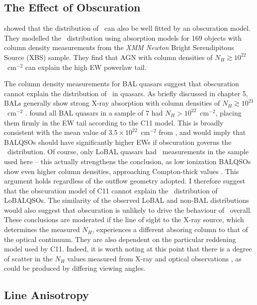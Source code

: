 \subsection{The Effect of Obscuration}
\label{sec:obscure}

\citet[][hereafter C11]{caccianiga2011} showed that the distribution of \ewo\
can also be well fitted by an obscuration model. They modelled the 
\ewo\ distribution using absorption models for 169 objects with column density
measurements from the {\sl XMM Newton} Bright Serendipitous Source (XBS)
sample. They find that AGN with column densities of 
$N_H\gtrsim10^{22}$~cm$^{-2}$ can explain the high EW powerlaw tail. 

The column density measurements for BAL quasars suggest that obscuration 
cannot explain the distribution of \ewo\ in quasars. 
As briefly discussed in chapter 5, BALs generally show
strong X-ray absorption with column densities of $N_H\gtrsim10^{23}$~cm$^{-2}$
\citep{green1996,mathur2000,green2001,grupemathur2003}. \cite{gallagher1999}
found all BAL quasars in a sample of 7 had $N_H>10^{22}$~cm$^{-2}$, placing
them firmly in the EW tail according to the C11 model. This is broadly
consistent with the mean value of $3.5\times10^{22}$~cm$^{-2}$ from
\cite{morabito2013}, and would imply that BALQSOs should have significantly
higher EWs if obscuration governs the \ewo\ distribution.
Of course, only LoBAL quasars had \ewo\ measurements 
in the sample used here -- this actually strengthens the conclusion, as low ionization 
BALQSOs show even higher column densities, approaching Compton-thick values 
\citep{morabito2011}. This argument holds regardless of the outflow geometry adopted.
I therefore suggest that the obscuration model of C11 cannot explain the \ewo\ distribution
of LoBALQSOs. The similarity of the observed LoBAL and non-BAL distributions
would also suggest that obscuration is unlikely to drive the behaviour of \ewo\ overall.
These conclusions are moderated if the line of sight to the X-ray source, which determines 
the measured $N_H$, experiences a different absoring column to that of the optical continuum.
They are also dependent on the particular reddening model used by C11. Indeed, it is worth noting at 
this point that there is a degree of scatter in the $N_H$ values measured from X-ray and optical
observations \citep{maiolino2001a,maiolino2001b}, as could be produced by differing 
viewing angles.


\subsection{Line Anisotropy}
\label{sec:line_aniso}

